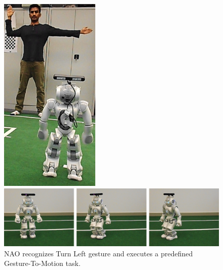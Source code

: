 \begin{figure}
	[h] 
	\begin{minipage}
		{1 
		\textwidth} \centering 
		\includegraphics[height=95mm]{figures/result/usr-turn-left.jpg} \caption*{} 
	\end{minipage}
	\begin{minipage}
		{1 
		\textwidth} \hspace{-5 mm} 
		\includegraphics[width=160mm]{figures/result/nao-gm-turn-left.jpg} 
	\end{minipage}
	\caption{NAO recognizes Turn Left gesture and executes a predefined Gesture-To-Motion task.} \label{res:gm:turn:left} 
\end{figure}
